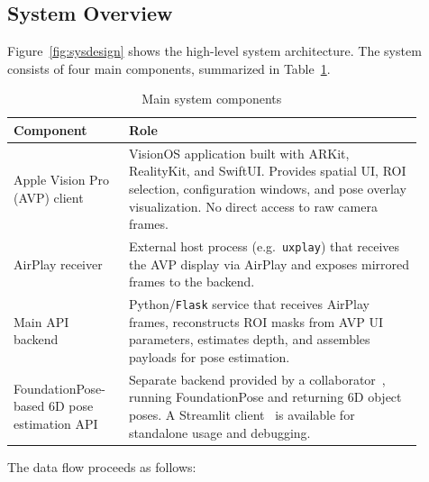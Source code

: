 \subsection{System Overview}

Figure~\ref{fig:sysdesign} shows the high-level system architecture. The system consists of four main components, summarized in Table~\ref{tab:system-components}.

\begin{table}[H]
    \centering
    \caption{Main system components}
    \label{tab:system-components}
    \begin{tabular}{p{0.25\linewidth}p{0.65\linewidth}}
        \toprule
        \textbf{Component} & \textbf{Role} \\
        \midrule
        Apple Vision Pro (AVP) client &
        VisionOS application built with ARKit, RealityKit, and SwiftUI. Provides spatial UI, ROI selection, configuration windows, and pose overlay visualization. No direct access to raw camera frames. \\
        AirPlay receiver &
        External host process (e.g.\ \texttt{uxplay}) that receives the AVP display via AirPlay and exposes mirrored frames to the backend. \\
        Main API backend &
        Python/\texttt{Flask} service that receives AirPlay frames, reconstructs ROI masks from AVP UI parameters, estimates depth, and assembles payloads for pose estimation. \\
        FoundationPose-based 6D pose estimation API &
        Separate backend provided by a collaborator~\cite{matchcow_pose_api}, running FoundationPose and returning 6D object poses. A Streamlit client~\cite{matchcow_serp_frontend} is available for standalone usage and debugging. \\
        \bottomrule
    \end{tabular}
\end{table}

The data flow proceeds as follows:

